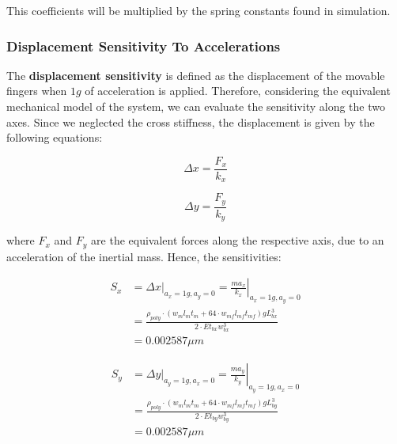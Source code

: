 \documentclass[lettersize,journal]{IEEEtran}
\begin{document}
        This coefficients will be multiplied by the spring constants found in simulation.
        
        \subsubsection{Displacement Sensitivity To Accelerations}
        The \textbf{displacement sensitivity} is defined as the displacement of the movable fingers when \(1g\) of acceleration is applied. Therefore, considering the equivalent mechanical model of the system, we can evaluate the sensitivity along the two axes. Since we neglected the cross stiffness, the displacement is given by the following equations:
        
        \begin{equation}\label{eq:x_disp}
            \Delta x = \frac{F_x}{k_x}
        \end{equation}
        
        \begin{equation}\label{eq:y_disp}
            \Delta y = \frac{F_y}{k_y}
        \end{equation}
        
        where \(F_x\) and \(F_y\) are the equivalent forces along the respective axis, due to an acceleration of the inertial mass.
        Hence, the sensitivities:
        
        \begin{equation}\label{eq:x_sens}
            \begin{split}
                S_x & = \left. \Delta x\right|_{a_x=1g,a_y=0}=\left. \frac{ma_x}{k_x} \right|_{a_x=1g,a_y=0} \\
                & =\frac{\rho_{poly} \cdot (w_m l_m t_m + 64\cdot w_{mf} l_{mf} t_{mf})gL^3_{bx}}{2\cdot Et_{bx}w^3_{bx}} \\
                & = 0.002587\mu m
            \end{split}
        \end{equation}
        
        \begin{equation}\label{eq:y_sens}
            \begin{split}
                S_y & = \left. \Delta y\right|_{a_y=1g,a_x=0}=\left. \frac{ma_y}{k_y} \right|_{a_y=1g,a_x=0} \\
                & =\frac{\rho_{poly} \cdot (w_m l_m t_m + 64\cdot w_{mf} l_{mf} t_{mf})gL^3_{by}}{2\cdot Et_{by}w^3_{by}} \\
                & = 0.002587\mu m
            \end{split}
        \end{equation}
        
\end{document}

